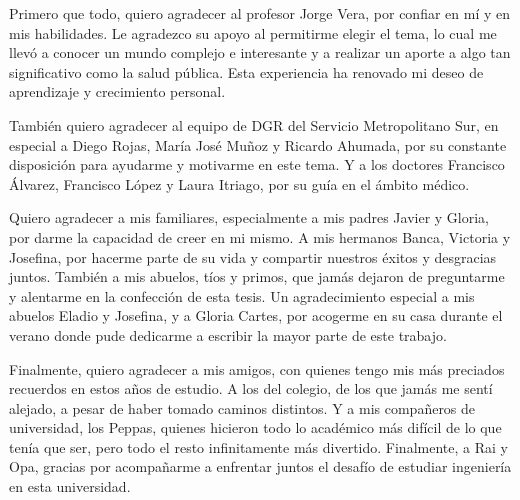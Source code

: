 Primero que todo, quiero agradecer al profesor Jorge Vera, por confiar en mí y en mis habilidades. Le agradezco su apoyo al permitirme elegir el tema, lo cual me llevó a conocer un mundo complejo e interesante y a realizar un aporte a algo tan significativo como la salud pública. Esta experiencia ha renovado mi deseo de aprendizaje y crecimiento personal.

También quiero agradecer al equipo de DGR del Servicio Metropolitano Sur, en especial a Diego Rojas, María José Muñoz y Ricardo Ahumada, por su constante disposición para ayudarme y motivarme en este tema. Y a los doctores Francisco Álvarez, Francisco López y Laura Itriago, por su guía en el ámbito médico.

Quiero agradecer a mis familiares, especialmente a mis padres Javier y Gloria, por darme la capacidad de creer en mi mismo. A mis hermanos Banca, Victoria y Josefina, por hacerme parte de su vida y compartir nuestros éxitos y desgracias juntos. También a mis abuelos, tíos y primos, que jamás dejaron de preguntarme y alentarme en la confección de esta tesis. Un agradecimiento especial a mis abuelos Eladio y Josefina, y a Gloria Cartes, por acogerme en su casa durante el verano donde pude dedicarme a escribir la mayor parte de este trabajo.

Finalmente, quiero agradecer a mis amigos, con quienes tengo mis más preciados recuerdos en estos años de estudio. A los del colegio, de los que jamás me sentí alejado, a pesar de haber tomado caminos distintos. Y a mis compañeros de universidad, los Peppas, quienes hicieron todo lo académico más difícil de lo que tenía que ser, pero todo el resto infinitamente más divertido. Finalmente, a Rai y Opa, gracias por acompañarme a enfrentar juntos el desafío de estudiar ingeniería en esta universidad.